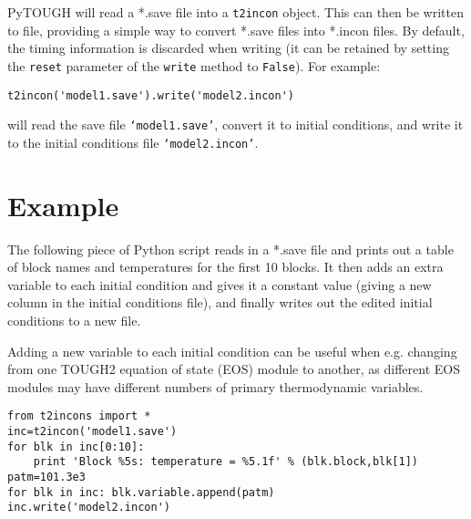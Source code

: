 PyTOUGH will read a *.save file into a \texttt{t2incon} object.  This can then be written to file, providing a simple way to convert *.save files into *.incon files.  By default, the timing information is discarded when writing (it can be retained by setting the \texttt{reset} parameter of the \texttt{write} method to \texttt{False}).  For example:

\begin{verbatim}
t2incon('model1.save').write('model2.incon')
\end{verbatim}

will read the save file \texttt{`model1.save'}, convert it to initial conditions, and write it to the initial conditions file \texttt{`model2.incon'}.

\section{Example}

The following piece of Python script reads in a *.save file and prints out a table of block names and temperatures for the first 10 blocks.  It then adds an extra variable to each initial condition and gives it a constant value (giving a new column in the initial conditions file), and finally writes out the edited initial conditions to a new file.

Adding a new variable to each initial condition can be useful when e.g. changing from one TOUGH2 equation of state (EOS) module to another, as different EOS modules may have different numbers of primary thermodynamic variables.

\begin{verbatim}
from t2incons import *
inc=t2incon('model1.save')
for blk in inc[0:10]:
    print 'Block %5s: temperature = %5.1f' % (blk.block,blk[1])
patm=101.3e3
for blk in inc: blk.variable.append(patm)
inc.write('model2.incon')

\end{verbatim}

